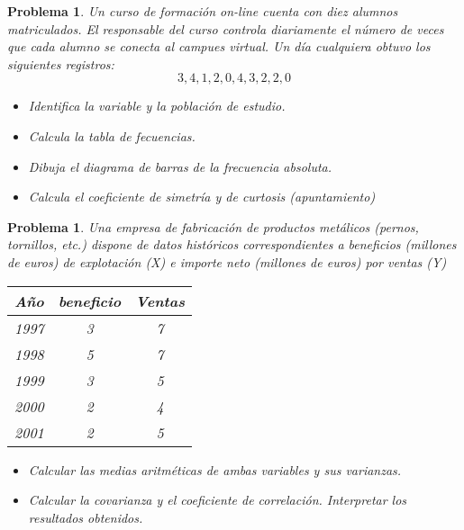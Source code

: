 \documentclass[a4paper,10pt]{article}
\newcounter{prbcont}
\newtheorem{problema}[prbcont]{Problema}
\begin{document}
\begin{problema}
Un curso de formaci\'on on-line cuenta con diez alumnos matriculados. El responsable del curso controla diariamente el número de veces que cada alumno se conecta al campues virtual. Un día cualquiera obtuvo los siguientes registros:
\[3,4,1,2,0,4,3,2,2,0\]
\begin{itemize}
\item [(a)] Identifica la variable y la poblaci\'on de estudio.
\item [(b)] Calcula la tabla de fecuencias.
\item [(c)] Dibuja el diagrama de barras de la frecuencia absoluta.
\item [(d)] Calcula el coeficiente de simetr\'ia y de curtosis (apuntamiento)
\end{itemize}
\end{problema}

\begin{problema}
Una empresa de fabricaci\'on de productos met\'alicos (pernos, tornillos, etc.) dispone de datos hist\'oricos correspondientes a beneficios (millones de euros) de explotaci\'on (X) e importe neto (millones de euros) por ventas (Y)
\begin{center}
\begin{tabular}{|c|c|c|}\hline
A\~no   & beneficio & Ventas \\ \hline
1997	&	3   & 7	\\ \hline
1998	&	5   & 7 \\ \hline
1999	&	3   & 5 \\ \hline
2000	&	2   & 4 \\ \hline
2001	&	2   & 5 \\ \hline
\end{tabular}
\end{center}
\begin{itemize}
\item [(a)] Calcular las medias aritm\'eticas de ambas variables y sus varianzas.
\item [(b)] Calcular la covarianza y el coeficiente de correlaci\'on. Interpretar los resultados obtenidos.
\end{itemize}
\end{problema}
\end{document}
